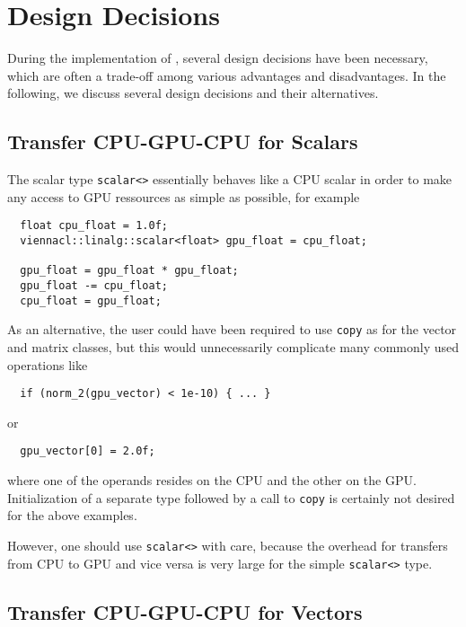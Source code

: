 \chapter{Design Decisions}
During the implementation of {\ViennaCL}, several design decisions have been
necessary, which are often a trade-off among various advantages and
disadvantages. In the following, we discuss several design decisions and their alternatives.

\section{Transfer CPU-GPU-CPU for Scalars}
The {\ViennaCL} scalar type \lstinline|scalar<>| essentially behaves like a CPU
scalar in order to make any access to GPU ressources as simple as possible, for example
\begin{lstlisting}
  float cpu_float = 1.0f;
  viennacl::linalg::scalar<float> gpu_float = cpu_float;

  gpu_float = gpu_float * gpu_float;
  gpu_float -= cpu_float;
  cpu_float = gpu_float;
\end{lstlisting}
As an alternative, the user could have been required to use \lstinline|copy| as
for the vector and matrix classes, but this would unnecessarily complicate many
commonly used operations like
\begin{lstlisting}
  if (norm_2(gpu_vector) < 1e-10) { ... }
\end{lstlisting}
or
\begin{lstlisting}
  gpu_vector[0] = 2.0f;
\end{lstlisting}
where one of the operands resides on the CPU and the other on the GPU.
Initialization of a separate type followed by a call to \lstinline|copy| is
certainly not desired for the above examples.

However, one should use \lstinline|scalar<>| with care, because the
overhead for transfers from CPU to GPU and vice versa is very large for the
simple \lstinline|scalar<>| type.



\section{Transfer CPU-GPU-CPU for Vectors}

